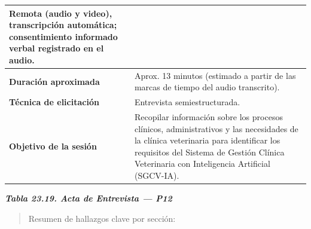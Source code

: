 \documentclass[
]{article}
\begin{document}
{\begin{longtable}[]{|
  >{\raggedright\arraybackslash}p{}|
  >{\raggedright\arraybackslash}p{}|}
\begin{minipage}[t]{\linewidth}
Remota (audio y video), transcripción automática; consentimiento informado verbal registrado en el audio.
\end{minipage} \\
\hline
\textbf{Duración aproximada} & \begin{minipage}[t]{\linewidth}\raggedright
Aprox. 13 minutos (estimado a partir de las marcas de tiempo del audio transcrito).
\end{minipage} \\
\hline
\textbf{Técnica de elicitación} & \begin{minipage}[t]{\linewidth}\raggedright
Entrevista semiestructurada.
\end{minipage} \\
\hline
\textbf{Objetivo de la sesión} & \begin{minipage}[t]{\linewidth}\raggedright
Recopilar información sobre los procesos clínicos, administrativos y las necesidades de la clínica veterinaria para identificar los requisitos del Sistema de Gestión Clínica Veterinaria con Inteligencia Artificial (SGCV-IA).
\end{minipage} \\
\hline
\end{longtable}
}

\protect{}\label{_bookmark_P12_acta}{}\emph{\textbf{Tabla 23.19. Acta de Entrevista --- P12}}

\begin{quote}
Resumen de hallazgos clave por sección:
\end{quote}
\end{document}
